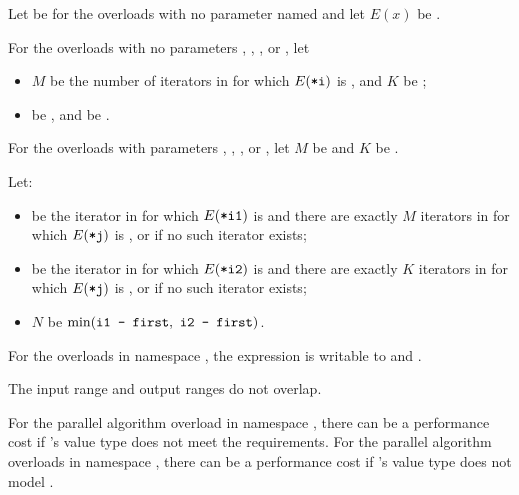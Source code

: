 \begin{itemdescr}
\pnum
Let  be 
for the overloads with no parameter named  and
let $E(x)$ be .

\pnum
For the overloads with no parameters
, , , or ,
let
\begin{itemize}
\item
  $M$ be the number of iterators  in 
  for which $E(\tcode{*i})$ is ,
  and $K$ be ;
\item
   be , and
   be .
\end{itemize}

\pnum
For the overloads with parameters
, , , or ,
let $M$ be 
and $K$ be .

\pnum
Let:
\begin{itemize}
\item
   be the iterator in 
  for which $E(\tcode{*i1})$ is 
  and there are exactly $M$ iterators  in 
  for which $E(\tcode{*j})$ is ,
  or  if no such iterator exists;
\item
   be the iterator in 
  for which $E(\tcode{*i2})$ is 
  and there are exactly $K$ iterators  in 
  for which $E(\tcode{*j})$ is ,
  or  if no such iterator exists;
\item
  $N$ be $\min(\tcode{i1 - first}, \ \tcode{i2 - first})$.
\end{itemize}

\pnum
\mandates
For the overloads in namespace ,
the expression 
is writable
to  and .

\pnum
\expects
The input range and output ranges do not overlap.

\begin{note}
For the parallel algorithm overload in namespace ,
there can be a performance cost if 's value type
does not meet the  requirements.
For the parallel algorithm overloads in namespace ,
there can be a performance cost if 's value type
does not model .
\end{note}


\end{itemdescr}
